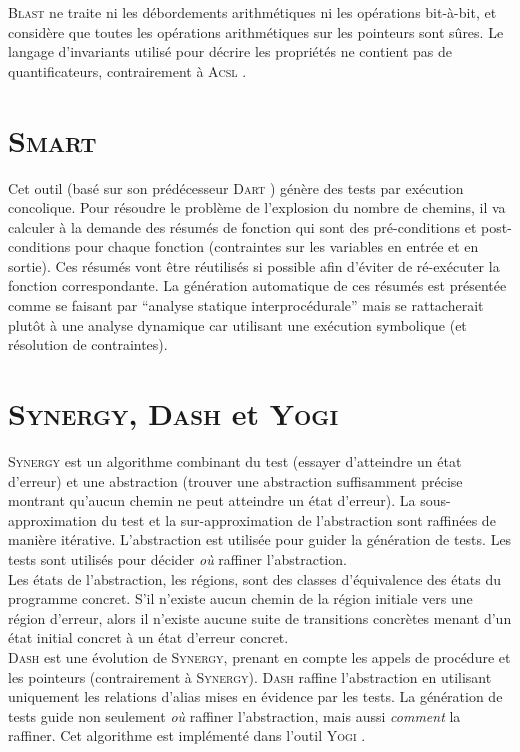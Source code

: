 \textsc{Blast} ne traite ni les débordements arithmétiques ni les opérations
bit-à-bit, et considère que toutes les opérations arithmétiques sur les
pointeurs sont sûres. Le langage d'invariants utilisé pour décrire les
propriétés ne contient pas de quantificateurs, contrairement à \textsc{Acsl}
\cite{ACSL}.

\section{\textsc{Smart}}

Cet outil \cite{SMART} (basé sur son prédécesseur \textsc{Dart} \cite{DART})
génère des tests par exécution concolique. Pour résoudre le problème de
l'explosion du nombre de chemins, il va calculer à la demande des résumés de
fonction qui sont des pré-conditions et post-conditions pour chaque fonction
(contraintes sur les variables en entrée et en sortie). Ces résumés vont être
réutilisés si possible afin d'éviter de ré-exécuter la fonction correspondante.
La génération automatique de ces résumés est présentée comme se faisant par
``analyse statique interprocédurale'' mais se rattacherait plutôt à une analyse
dynamique car utilisant une exécution symbolique (et résolution de contraintes).

\section{\textsc{Synergy}, \textsc{Dash} et \textsc{Yogi}}

\textsc{Synergy} \cite{SYNERGY} est un algorithme combinant du test (essayer
d'atteindre un état d'erreur) et une abstraction (trouver une abstraction
suffisamment précise montrant qu'aucun chemin ne peut atteindre un état
d'erreur). La sous-approximation du test et la sur-approximation de
l'abstraction sont raffinées de manière itérative. L'abstraction est utilisée
pour guider la génération de tests. Les tests sont utilisés pour décider
{\em où} raffiner l'abstraction.\\

Les états de l'abstraction, les régions, sont des classes d'équivalence des
états du programme concret. S'il n'existe aucun chemin de la région initiale
vers une région d'erreur, alors il n'existe aucune suite de transitions
concrètes menant d'un état initial concret à un état d'erreur concret.\\

\textsc{Dash} \cite{DASH} est une évolution de \textsc{Synergy}, prenant en
compte les appels de procédure et les pointeurs (contrairement à
\textsc{Synergy}). \textsc{Dash} raffine l'abstraction en utilisant uniquement
les relations d'alias mises en évidence par les tests. La génération de tests
guide non seulement {\em où} raffiner l'abstraction, mais aussi {\em comment}
la raffiner. Cet algorithme est implémenté dans l'outil \textsc{Yogi}
\cite{YOGI}.

